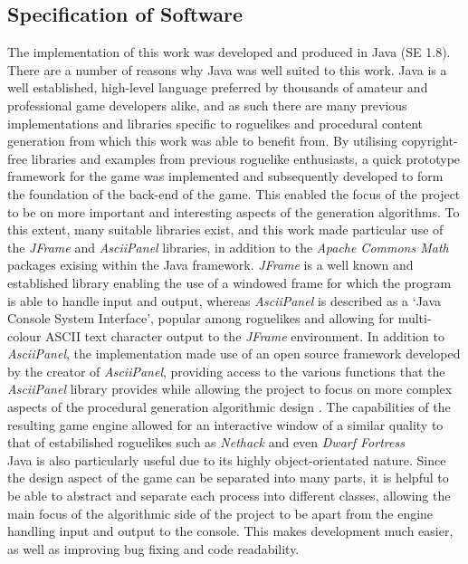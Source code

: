 \documentclass[12pt,a4paper]{article}
\begin{document}
\subsection{Specification of Software}

The implementation of this work was developed and produced in Java (SE 1.8). There are a number of reasons why Java was well suited to this work. Java is a well established, high-level language preferred by thousands of amateur and professional game developers alike, and as such there are many previous implementations and libraries specific to roguelikes and procedural content generation from which this work was able to benefit from. By utilising copyright-free libraries and examples from previous roguelike enthusiasts, a quick prototype framework for the game was implemented and subsequently developed to form the foundation of the back-end of the game. This enabled the focus of the project to be on more important and interesting aspects of the generation algorithms. To this extent, many suitable libraries exist, and this work made particular use of the \emph{JFrame} and \emph{AsciiPanel} libraries, in addition to the \emph{Apache Commons Math} packages exising within the Java framework. \emph{JFrame} is a well known and established library enabling the use of a windowed frame for which the program is able to handle input and output, whereas \emph{AsciiPanel} is described as a `Java Console System Interface', popular among roguelikes and allowing for multi-colour ASCII text character output to the \emph{JFrame} environment. In addition to \emph{AsciiPanel}, the implementation made use of an open source framework developed by the creator of \emph{AsciiPanel}, providing access to the various functions that the \emph{AsciiPanel} library provides while allowing the project to focus on more complex aspects of the procedural generation algorithmic design \cite{trystan}. The capabilities of the resulting game engine allowed for an interactive window of a similar quality to that of estabilished roguelikes such as \emph{Nethack} and even \emph{Dwarf Fortress}\\

Java is also particularly useful due to its highly object-orientated nature. Since the design aspect of the game can be separated into many parts, it is helpful to be able to abstract and separate each process into different classes, allowing the main focus of the algorithmic side of the project to be apart from the engine handling input and output to the console. This makes development much easier, as well as improving bug fixing and code readability.\\
\end{document}
